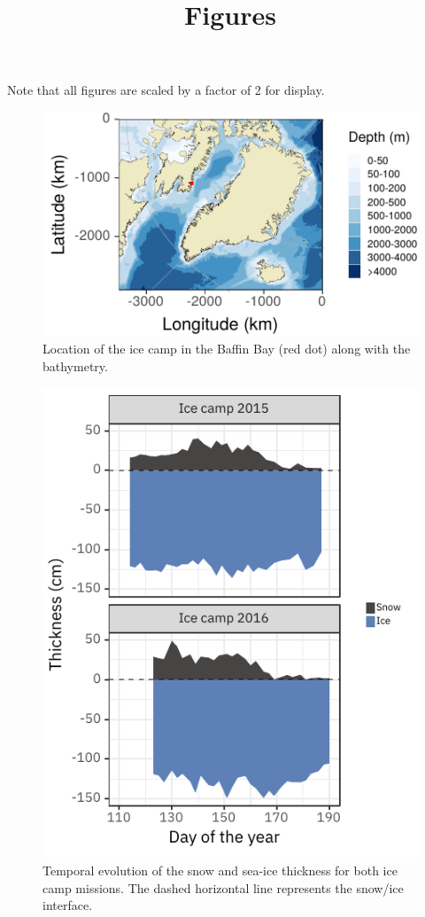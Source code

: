 \documentclass[12pt,a4paper]{scrartcl}
\title{Figures}
\date{}
\begin{document}
\maketitle

Note that all figures are scaled by a factor of 2 for display.

\begin{figure}[h]
	\centering
	\includegraphics[scale = 2]{../../../graphs/fig1.pdf}
	\caption{Location of the ice camp in the Baffin Bay (red dot) along with the bathymetry.}
\end{figure}

\clearpage
\newpage

\begin{figure}[h]
	\centering
	\includegraphics[scale = 2]{../../../graphs/fig2.pdf}
	\caption{Temporal evolution of the snow and sea-ice thickness for both ice camp missions. The dashed horizontal line represents the snow/ice interface.}
\end{figure}
\end{document}
